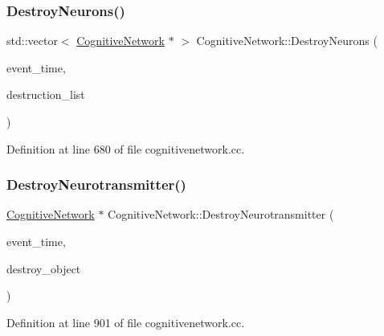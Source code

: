 \subsubsection{\texorpdfstring{Destroy\+Neurons()}{DestroyNeurons()}}
{\footnotesize\ttfamily std\+::vector$<$ \mbox{\hyperlink{class_cognitive_network}{Cognitive\+Network}} $\ast$ $>$ Cognitive\+Network\+::\+Destroy\+Neurons (\begin{DoxyParamCaption}\item[{std\+::chrono\+::time\+\_\+point$<$ \mbox{\hyperlink{universe_8h_a0ef8d951d1ca5ab3cfaf7ab4c7a6fd80}{Clock}} $>$}]{event\+\_\+time,  }\item[{std\+::vector$<$ \mbox{\hyperlink{class_cognitive_network}{Cognitive\+Network}} $\ast$$>$}]{destruction\+\_\+list }\end{DoxyParamCaption})}



Definition at line 680 of file cognitivenetwork.\+cc.

\mbox{\label{class_cognitive_network_a0f943978df49ef879c43c15c81682a8a}} 
\subsubsection{\texorpdfstring{Destroy\+Neurotransmitter()}{DestroyNeurotransmitter()}}
{\footnotesize\ttfamily \mbox{\hyperlink{class_cognitive_network}{Cognitive\+Network}} $\ast$ Cognitive\+Network\+::\+Destroy\+Neurotransmitter (\begin{DoxyParamCaption}\item[{std\+::chrono\+::time\+\_\+point$<$ \mbox{\hyperlink{universe_8h_a0ef8d951d1ca5ab3cfaf7ab4c7a6fd80}{Clock}} $>$}]{event\+\_\+time,  }\item[{\mbox{\hyperlink{class_cognitive_network}{Cognitive\+Network}} $\ast$}]{destroy\+\_\+object }\end{DoxyParamCaption})}



Definition at line 901 of file cognitivenetwork.\+cc.

\mbox{\label{class_cognitive_network_a7f705e562562e9778ee0b5260dda9f09}} 
